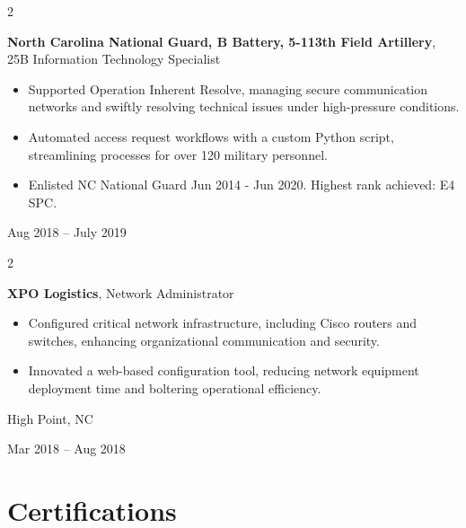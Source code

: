 \documentclass[10pt, letterpaper]{article}
\newenvironment{highlights}{
    \begin{itemize}[
        topsep=0.10 cm,
        parsep=0.10 cm,
        partopsep=0pt,
        itemsep=0pt,
        leftmargin=0.4 cm + 10pt
    ]
}{
    \end{itemize}
} %
\newenvironment{twocolentry}[2][]{
    \onecolentry
    \def\secondColumn{#2}
    \setcolumnwidth{\fill, 4.5 cm}
    \begin{paracol}{2}
}{
    \switchcolumn \raggedleft \secondColumn
    \end{paracol}
    \endonecolentry
} %
\begin{document}
        \vspace{0.2 cm}

        \begin{twocolentry}{
            Aug 2018 – July 2019
        }
            \textbf{North Carolina National Guard, B Battery, 5-113th Field Artillery}, 25B Information Technology Specialist
            \begin{highlights}
                \item Supported Operation Inherent Resolve, managing secure communication networks and swiftly resolving technical issues under high-pressure conditions.
                \item Automated access request workflows with a custom Python script, streamlining processes for over 120 military personnel.
                \item Enlisted NC National Guard Jun 2014 - Jun 2020. Highest rank achieved: E4 SPC.
            \end{highlights}
        \end{twocolentry}


        \vspace{0.2 cm}

        \begin{twocolentry}{
            High Point, NC

        Mar 2018 – Aug 2018
        }
            \textbf{XPO Logistics}, Network Administrator
            \begin{highlights}
                \item Configured critical network infrastructure, including Cisco routers and switches, enhancing organizational communication and security.
                \item Innovated a web-based configuration tool, reducing network equipment deployment time and boltering operational efficiency.
            \end{highlights}
        \end{twocolentry}



    
    \section{Certifications}
\end{document}
